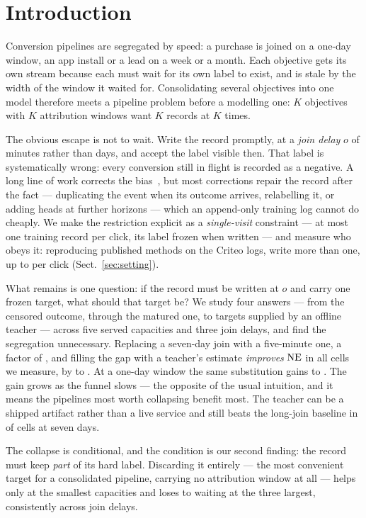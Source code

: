 \section{Introduction}
\label{sec:intro}

Conversion pipelines are segregated by speed: a purchase is joined on a one-day window, an
app install or a lead on a week or a month. Each objective gets its own stream because each
must wait for its own label to exist, and is stale by the width of the window it waited for.
Consolidating several objectives into one model therefore meets a pipeline problem before a
modelling one: $K$ objectives with $K$ attribution windows want $K$ records at $K$ times.

The obvious escape is not to wait. Write the record promptly, at a \emph{join delay} $o$ of
minutes rather than days, and accept the label visible then. That label is systematically wrong: every conversion still in flight is recorded as a
negative. A long line of work corrects the
bias~\cite{chapelle2014modeling,yasui2020feedback,yang2021capturing,chen2022asymptotically,ding2026delayed},
but most corrections repair the record after the fact --- duplicating the event when its
outcome arrives, relabelling it, or adding heads at further horizons --- which an append-only
training log cannot do cheaply. We make the restriction explicit as a \emph{single-visit} constraint --- at most one training
record per click, its label frozen when written --- and measure who obeys it: reproducing
\nScreened{} published methods on the Criteo logs, \nFail{} write more than one, up to
\maxDup{} per click (Sect.~\ref{sec:setting}).

What remains is one question: if the record must be written at $o$ and carry one frozen
target, what should that target be? We study four answers --- from the censored outcome,
through the matured one, to targets supplied by an offline teacher --- across five served
capacities and three join delays, and find the segregation unnecessary. Replacing a seven-day join with a five-minute one,
a factor of \ratioSeven{}, and filling the gap with a teacher's estimate \emph{improves} $\mathrm{NE}$
in all \nContrast{} cells we measure, by \collapseSevenBest{} to \collapseSevenWorst{}. At a
one-day window the same substitution gains \collapseOneBest{} to \collapseOneWorst{}. The gain grows as the funnel slows --- the opposite of the usual intuition, and it means the
pipelines most worth collapsing benefit most. The teacher can be a shipped artifact rather than
a live service and still beats the long-join baseline in \frzSevenBeat{} of \frzSevenN{} cells
at seven days.

The collapse is conditional, and the condition is our second finding: the record must keep
\emph{part} of its hard label. Discarding it entirely --- the most convenient target for a
consolidated pipeline, carrying no attribution window at all --- helps only at the smallest
capacities and loses to waiting at the three largest, consistently across join delays.
